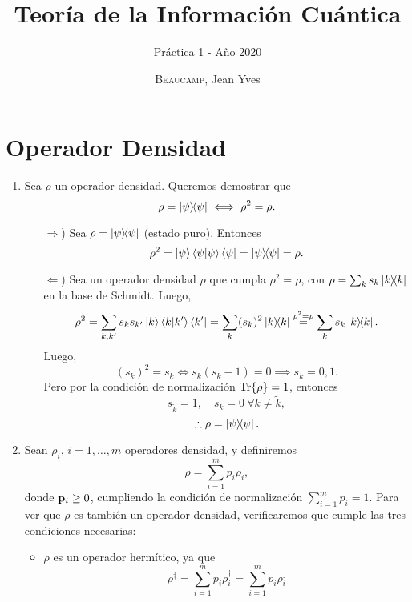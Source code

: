 \documentclass{scrartcl}
\title{Teoría de la Información Cuántica}
\subtitle{Práctica 1 - Año 2020}
\author{\textsc{Beaucamp}, Jean Yves}
\date{}
\newcommand{\p}{\vb{p}}
\DeclareRobustCommand{\[}{\begin{equation}}
\DeclareRobustCommand{\]}{\end{equation}}
\begin{document}
\maketitle

\section{Operador Densidad}
\begin{enumerate}
    
    \item Sea $\rho$ un operador densidad. Queremos demostrar que
    \[ \rho = \dyad{\psi}{\psi} \iff \rho^2 = \rho. \]
    \begin{itemize}
        \item[$\Longrightarrow$)] Sea $\rho = \dyad{\psi}{\psi}$ (estado puro). Entonces
        \[ \rho^2 = \ket{\psi} \bra{\psi}\ket{\psi} \bra{\psi} = \dyad{\psi}{\psi} = \rho. \]
        \item[$\Longleftarrow$)] Sea un operador densidad $\rho$ que cumpla $\rho^2 = \rho$, con $\rho = \sum_{k} s_k \dyad{k}{k}$ en la base de Schmidt. Luego,
        \[ \rho^2 = \sum_{k, k'} s_k s_{k'} \ket{k} \bra{k} \ket{k'} \bra{k'} = \sum_{k} (s_k)^2 \dyad{k}{k} \stackrel{\rho^2 = \rho}{=} \sum_k s_k \dyad{k}{k}. \]
        Luego,
        \[ (s_k)^2 = s_k \iff s_k(s_k - 1) = 0 \implies s_k = 0, 1. \]
        Pero por la condición de normalización $\Tr{\rho} = 1$, entonces
        \[ s_{\tilde{k}} = 1, \quad s_k = 0 \ \forall k\neq\tilde{k}, \]
        \[ \therefore \rho = \dyad{\psi}{\psi}. \]
    \end{itemize}
    
    
    
    \item Sean $\rho_i$, $i = 1, \dots, m$ operadores densidad, y definiremos
    \[ \rho = \sum_{i = 1}^m p_i \rho_i, \]
    donde $\p_i \geq 0$, cumpliendo la condición de normalización $\sum_{i = 1}^{m} p_i = 1$. Para ver que $\rho$ es también un operador densidad, verificaremos que cumple las tres condiciones necesarias:
    \begin{itemize}
        \item $\rho$ es un operador hermítico, ya que
        \[ \rho^\dagger = \sum_{i = 1}^m p_i \rho_i^\dagger = \sum_{i = 1}^m p_i \rho_i^. \]
        

\end{itemize}
\end{enumerate}
\end{document}
